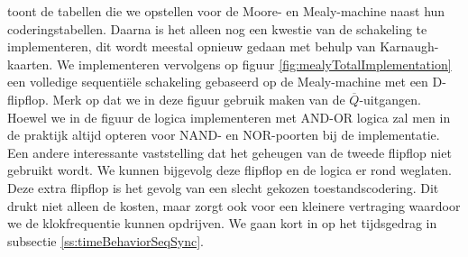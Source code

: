 \begin{table}[hbt]
\centering
{}
\caption{Uitgangslogica van de Moore- en Mealy-machine naast hun coderingstabellen.}
\label{tbl:mooreMealyTables}
\end{table}
toont de tabellen die we opstellen voor de Moore- en Mealy-machine naast hun coderingstabellen. Daarna is het alleen nog een kwestie van de schakeling te implementeren, dit wordt meestal opnieuw gedaan met behulp van Karnaugh-kaarten. We implementeren vervolgens op figuur \ref{fig:mealyTotalImplementation} een volledige sequenti\"ele schakeling gebaseerd op de Mealy-machine met een D-flipflop. Merk op dat we in deze figuur gebruik maken van de $\overline{Q}$-uitgangen. Hoewel we in de figuur de logica implementeren met AND-OR logica zal men in de praktijk altijd opteren voor NAND- en NOR-poorten bij de implementatie. Een andere interessante vaststelling dat het geheugen van de tweede flipflop niet gebruikt wordt. We kunnen bijgevolg deze flipflop en de logica er rond weglaten. Deze extra flipflop is het gevolg van een slecht gekozen toestandscodering. Dit drukt niet alleen de kosten, maar zorgt ook voor een kleinere vertraging waardoor we de klokfrequentie kunnen opdrijven. We gaan kort in op het tijdsgedrag in subsectie \ref{ss:timeBehaviorSeqSync}.
